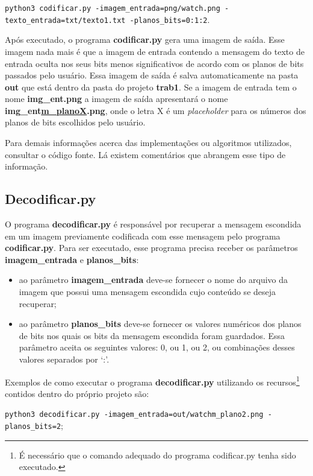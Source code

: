 \documentclass{article}
\begin{document}
\lstinline{python3 codificar.py -imagem_entrada=png/watch.png -texto_entrada=txt/texto1.txt -planos_bits=0:1:2}.

\noindent
Após executado, o programa \textbf{codificar.py} gera uma imagem de saída. Esse imagem nada mais é que a imagem de entrada contendo a mensagem do texto de entrada oculta nos seus bits menos significativos de acordo com os planos de bits passados pelo usuário. Essa imagem de saída é salva automaticamente na pasta \textbf{out} que está dentro da pasta do projeto \textbf{trab1}. Se a imagem de entrada tem o nome \textbf{img\_ent.png} a imagem de saída apresentará o nome \textbf{img\_ent\underline{m\_planoX}.png}, onde o letra X é um \textit{placeholder} para os números dos planos de bits escolhidos pelo usuário.

Para demais informações acerca das implementações ou algoritmos utilizados, consultar o código fonte. Lá existem comentários que abrangem esse tipo de informação.

%
\subsection{Decodificar.py}
O programa \textbf{decodificar.py} é responsável por recuperar a mensagem escondida em um imagem previamente codificada com esse mensagem pelo programa \textbf{codificar.py}. Para ser executado, esse programa precisa receber os parâmetros \textbf{imagem\_entrada} e \textbf{planos\_bits}:

\begin{itemize}
	\item ao parâmetro \textbf{imagem\_entrada} deve-se fornecer o nome do arquivo da imagem que possui uma mensagem escondida cujo conteúdo se deseja recuperar;
	\item ao parâmetro \textbf{planos\_bits} deve-se fornecer os valores numéricos dos planos de bits nos quais os bits da mensagem escondida foram guardados. Essa parâmetro aceita os seguintes valores: 0, ou 1, ou 2, ou combinações desses valores separados por `:'.
\end{itemize}

\noindent
Exemplos de como executar o programa \textbf{decodificar.py} utilizando os recursos\footnote{É necessário que o comando adequado do programa codificar.py tenha sido executado.\label{refnote}} contidos dentro do próprio projeto são:

\lstinline{python3 decodificar.py -imagem_entrada=out/watchm_plano2.png -planos_bits=2};
\end{document}

